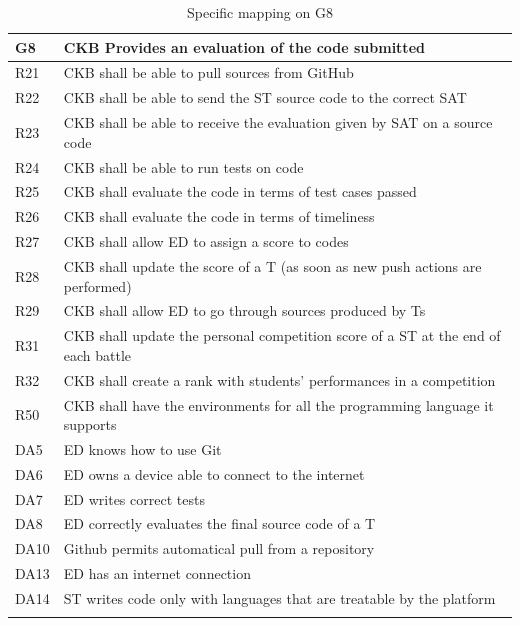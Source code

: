   \begin{longtable}{|l|p{12cm}|}
    \hline
    \textbf{G8} & \textbf{CKB Provides an evaluation of the code submitted}      \\
    \hline
    R21 & CKB shall be able to pull sources from GitHub \\
    \hline
    R22 & CKB shall be able to send the ST source code to the correct SAT \\
    \hline
    R23 & CKB shall be able to receive the evaluation given by SAT on a source code \\
    \hline
    R24 & CKB shall be able to run tests on code \\
    \hline
    R25 & CKB shall evaluate the code in terms of test cases passed \\
    \hline
    R26 & CKB shall evaluate the code in terms of timeliness \\
    \hline
    R27 & CKB shall allow ED to assign a score to codes \\
    \hline
    R28 & CKB shall update the score of a T (as soon as new push actions are performed) \\
    \hline
    R29 & CKB shall allow ED to go through sources produced by Ts \\
    \hline
    R31 & CKB shall update the personal competition score of a ST at the end of each battle \\
    \hline
    R32 & CKB shall create a rank with students' performances in a competition \\
    \hline
    R50 & CKB shall have the environments for all the programming language it supports \\
    \hline
    DA5 & ED knows how to use Git \\
    \hline
    DA6 & ED owns a device able to connect to the internet \\
    \hline
    DA7 & ED writes correct tests \\
    \hline
    DA8 & ED correctly evaluates the final source code of a T \\
    \hline
    DA10 & Github permits automatical pull from a repository \\
    \hline
    DA13 & ED has an internet connection \\
    \hline
    DA14 & ST writes code only with languages that are treatable by the platform \\
    \hline

    \caption{Specific mapping on G8}
    \label{tab:mappingG8}
  \end{longtable}


